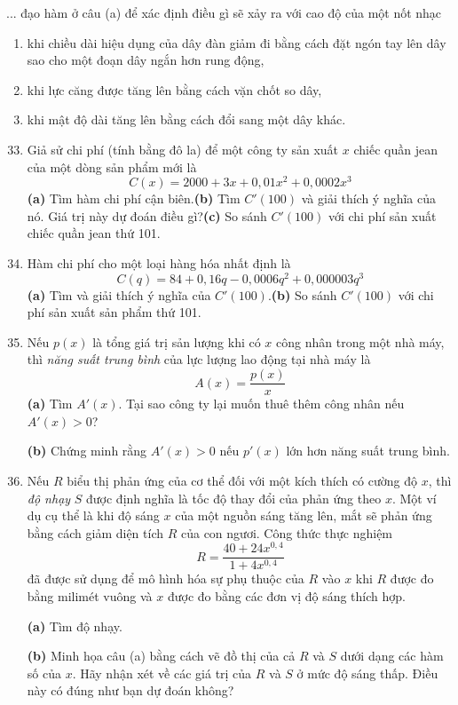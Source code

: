 \noindent
\begin{minipage}[t]{0.485\textwidth}
\vspace{0pt}
\noindent
... đạo hàm ở câu (a) để xác định điều gì sẽ xảy ra với cao độ của một nốt nhạc
\begin{enumerate}[label=(\roman*),leftmargin=1.8em,itemsep=1.5pt,topsep=2.5pt,partopsep=0pt,parsep=0pt]
  \item khi chiều dài hiệu dụng của dây đàn giảm đi bằng cách đặt ngón tay lên dây sao cho một đoạn dây ngắn hơn rung động,
  \item khi lực căng được tăng lên bằng cách vặn chốt so dây,
  \item khi mật độ dài tăng lên bằng cách đổi sang một dây khác.
\end{enumerate}

\begin{enumerate}[label=\textbf{\arabic*.},leftmargin=1.6em,labelsep=0.4em,itemsep=6pt,topsep=5pt,parsep=1.5pt]
\setcounter{enumi}{32}
  \item Giả sử chi phí (tính bằng đô la) để một công ty sản xuất $x$ chiếc quần jean của một dòng sản phẩm mới là
  \[
  C(x) = 2000 + 3x + 0{,}01x^2 + 0{,}0002x^3
  \]
  \textbf{(a)} Tìm hàm chi phí cận biên.\quad \textbf{(b)} Tìm $C'(100)$ và giải thích ý nghĩa của nó. Giá trị này dự đoán điều gì?\quad \textbf{(c)} So sánh $C'(100)$ với chi phí sản xuất chiếc quần jean thứ 101.

  \item Hàm chi phí cho một loại hàng hóa nhất định là
  \[
  C(q) = 84 + 0{,}16q - 0{,}0006q^2 + 0{,}000003q^3
  \]
  \textbf{(a)} Tìm và giải thích ý nghĩa của $C'(100)$.\quad \textbf{(b)} So sánh $C'(100)$ với chi phí sản xuất sản phẩm thứ 101.

  \item Nếu $p(x)$ là tổng giá trị sản lượng khi có $x$ công nhân trong một nhà máy, thì \textit{năng suất trung bình} của lực lượng lao động tại nhà máy là
  \[
  A(x) = \frac{p(x)}{x}
  \]
  \textbf{(a)} Tìm $A'(x)$. Tại sao công ty lại muốn thuê thêm công nhân nếu $A'(x) > 0$?\par
  \textbf{(b)} Chứng minh rằng $A'(x) > 0$ nếu $p'(x)$ lớn hơn năng suất trung bình.

  \item Nếu $R$ biểu thị phản ứng của cơ thể đối với một kích thích có cường độ $x$, thì \textit{độ nhạy} $S$ được định nghĩa là tốc độ thay đổi của phản ứng theo $x$. Một ví dụ cụ thể là khi độ sáng $x$ của một nguồn sáng tăng lên, mắt sẽ phản ứng bằng cách giảm diện tích $R$ của con ngươi. Công thức thực nghiệm
  \[
  R = \frac{40 + 24x^{0{,}4}}{1 + 4x^{0{,}4}}
  \]
  đã được sử dụng để mô hình hóa sự phụ thuộc của $R$ vào $x$ khi $R$ được đo bằng milimét vuông và $x$ được đo bằng các đơn vị độ sáng thích hợp.
  \par
  \textbf{(a)} Tìm độ nhạy.\par
  \noindent\llap{\graphicon\hspace{3.5pt}}\textbf{(b)} Minh họa câu (a) bằng cách vẽ đồ thị của cả $R$ và $S$ dưới dạng các hàm số của $x$. Hãy nhận xét về các giá trị của $R$ và $S$ ở mức độ sáng thấp. Điều này có đúng như bạn dự đoán không?


\end{enumerate}
\end{minipage}
